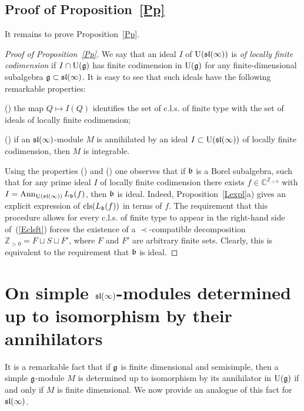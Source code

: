 \documentclass[10pt]{amsart}\oddsidemargin -1mm \evensidemargin -1mm \topmargin -15mm\headheight5mm \headsep 3.5mm \textheight 245mm\textwidth 170mm %
\theoremstyle{definition}\newtheorem{theorem}{Theorem}[section]\newtheorem{lemma}[theorem]{Lemma}\newtheorem{remark}[theorem]{Remark}\newtheorem{proposition}[theorem]{Proposition}\newtheorem{corollary}[theorem]{Corollary}\newtheorem{definition}[theorem]{Definition}\newtheorem{Ex}[theorem]{Example}
\begin{document}
\subsection{Proof of Proposition~\ref{Pp}} It remains to prove Proposition~\ref{Pp}.
\begin{proof}[Proof of Proposition~\ref{Pp}]%
We say that an ideal $I$ of $\operatorname{\mathrm{U}}(\frak{sl}(\infty))$ is {\it of locally finite codimension} if $I\cap\operatorname{\mathrm{U}}(\frak g)$ has finite codimension in $\operatorname{\mathrm{U}}(\frak g)$ for any finite-dimensional subalgebra $\frak g\subset\frak{sl}(\infty)$. It is easy to see that such ideals have the following remarkable properties:

() the map $Q\mapsto I(Q)$ identifies the set of c.l.s. of finite type with the set of ideals of locally finite codimension;

() if an $\frak{sl}(\infty)$-module $M$ is annihilated by an ideal $I\subset\operatorname{\mathrm{U}}(\frak{sl}(\infty))$ of locally finite codimension, then $M$ is integrable.

Using the properties () and () one observes that if $\frak b$ is a Borel subalgebra, such that for any prime ideal $I$ of locally finite codimension there exists $f\in\mathbb C^{\mathbb Z_{>0}}$ with $I=\operatorname{\mathrm{Ann}}_{\operatorname{\mathrm{U}}(\frak{sl}(\infty))}L_\frak b(f)$, then $\frak b$ is ideal. Indeed, Proposition~\ref{Lexpl}a) gives an explicit expression of $\operatorname{\mathrm{cls}}(L_\frak b(f))$ in terms of $f$. The requirement that this procedure allows for every c.l.s. of finite type to appear in the right-hand side of~(\ref{Eclsft}) forces the existence of a $\prec$-compatible decomposition $\mathbb Z_{>0}=F\sqcup S\sqcup F'$, where $F$ and $F'$ are arbitrary finite sets. Clearly, this is equivalent to the requirement that $\frak b$ is ideal.

\end{proof}
\section{On simple $\frak{sl}(\infty)$-modules determined up to isomorphism by their annihilators}\label{Snew}
It is a remarkable fact that if $\frak g$ is finite dimensional and semisimple, then a simple $\frak g$-module $M$ is determined up to isomorphism by its annihilator in $\operatorname{\mathrm{U}}(\frak g)$ if and only if $M$ is finite dimensional. We now provide an analogue of this fact for $\frak{sl}(\infty)$.
\end{document}
